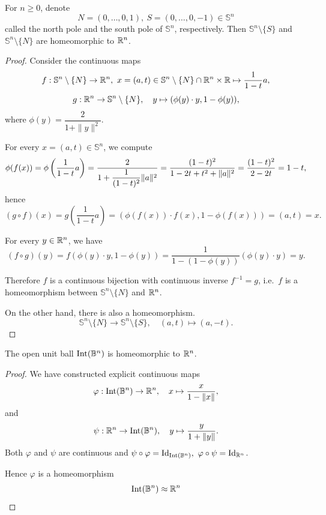 \begin{proposition}\label{prop:stereo}
    For $n \geq 0$, denote 
    \[N=(0,\ldots,0,1),~S=(0,\ldots,0,-1)\in \mathbb{S}^n\]
    called the north pole and the south pole of $\mathbb{S}^n$, respectively. Then $\mathbb{S}^n\setminus\{S\}$ and $\mathbb{S}^n\setminus\{N\}$ are homeomorphic to $\mathbb{R}^n$.
\end{proposition}

\begin{proof}
    Consider the continuous maps
    \[
        f:\mathbb{S}^n\setminus\{N\}\to \mathbb{R}^n,~
        x=(a,t) \in \mathbb{S}^n\setminus\{N\} \cap \mathbb{R}^n \times \mathbb{R}\mapsto \dfrac{1}{1-t}a,
    \]
    \[
        g:\mathbb{R}^n\to \mathbb{S}^n\setminus\{N\}, \quad 
        y \mapsto (\phi(y)\cdot y,1-\phi(y)),
    \]
    where $\phi(y)=\dfrac{2}{1+\|y\|^2}$.

    For every $x=(a,t)\in \mathbb{S}^n$, we compute
    \[
        \phi(f(x))=\phi\left(\dfrac{1}{1-t}a\right)=\dfrac{2}{1+\dfrac{1}{(1-t)^2}\lVert a\rVert^2} = \dfrac{(1-t)^2}{1-2t+t^2+\lVert a\rVert^2}=\dfrac{(1-t)^2}{2-2t}
        =1-t,
    \]
    hence
        \[(g\circ f)(x)
        =g\left(\dfrac{1}{1-t}a\right)
        =\left(\phi(f(x))\cdot f(x),1-\phi(f(x))\right)
        =(a,t)=x.\]

    For every $y\in \mathbb{R}^n$, we have
        \[(f\circ g)(y)
        =f(\phi(y)\cdot y,1-\phi(y))
        = \dfrac{1}{1-(1-\phi(y))}\left(\phi(y)\cdot y\right)
        =y.\]

    Therefore $f$ is a continuous bijection with continuous inverse $f^{-1}=g$, i.e.\ $f$ is a homeomorphism between $\mathbb{S}^n\setminus\{N\}$ and $\mathbb{R}^n$.

    On the other hand, there is also a homeomorphism.
    \[
        \mathbb{S}^n\setminus\{N\}\to \mathbb{S}^n\setminus\{S\}, \quad 
        (a,t)\mapsto (a,-t).
    \]
\end{proof}

\begin{proposition}\label{prop:open-ball-Rn}
    The open unit ball $\operatorname{Int}(\mathbb{B}^n)$ 
    is homeomorphic to $\mathbb{R}^n$.
\end{proposition}

\begin{proof}
    We have constructed explicit continuous maps
    \[
        \varphi:\operatorname{Int}(\mathbb{B}^n)\to \mathbb{R}^n, \quad x \mapsto \dfrac{x}{1-\lVert x\rVert}, 
    \]
    and
    \[
        \psi:\mathbb{R}^n\to \operatorname{Int}(\mathbb{B}^n), \quad y \mapsto \dfrac{y}{1+\|y\|}.
    \]
    Both $\varphi$ and $\psi$ are continuous and
    $\psi\circ \varphi =\operatorname{Id}_{\operatorname{Int}(\mathbb{B}^n)},~ \varphi\circ \psi=\operatorname{Id}_{\mathbb{R}^n}$. 
    
    Hence $\varphi$ is a homeomorphism
    \[
        \operatorname{Int}(\mathbb{B}^n) \approx \mathbb{R}^n
    \]
\end{proof}

